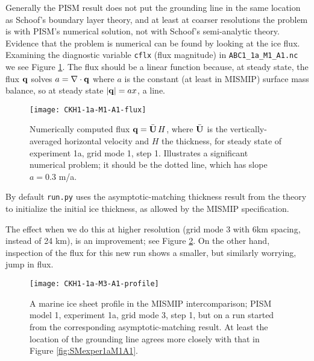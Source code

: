 Generally the PISM result does not put the grounding line in the same location as Schoof's boundary layer theory, and at least at coarser resolutions the problem is with PISM's numerical solution, not with Schoof's semi-analytic theory.  Evidence that the problem is numerical can be found by looking at the ice flux.  Examining the diagnostic variable \texttt{cflx} (flux magnitude) in \texttt{ABC1_1a_M1_A1.nc} we see Figure \ref{fig:cflx1aM1A1}.  The flux should be a linear function because, at steady state, the flux $\mathbf{q}$ solves $a=\nabla\cdot\mathbf{q}$ where $a$ is the constant (at least in MISMIP) surface mass balance, so at steady state $|\mathbf{q}| = a x$, a line.

\begin{figure}[ht]
\centering
\texttt{[image: CKH1-1a-M1-A1-flux]}
\caption{Numerically computed flux $\mathbf{q} = \bar{\mathbf{U}}\, H$, where $\bar{\mathbf{U}}$ is the vertically-averaged horizontal velocity and $H$ the thickness, for steady state of experiment 1a, grid mode 1, step 1.  Illustrates a significant numerical problem; it should be the dotted line, which has slope $a = 0.3$ m/a.}
\label{fig:cflx1aM1A1}
\end{figure}

By default \texttt{run.py} uses the asymptotic-matching thickness result from the \cite{SchoofMarine1} theory to initialize the initial ice thickness, as allowed by the MISMIP specification.

The effect when we do this at higher resolution (grid mode 3 with 6km spacing, instead of 24 km), is an improvement; see Figure \ref{fig:MISMIPmodel1exper1aM3A1FROMSM}.
On the other hand, inspection of the flux for this new run shows a smaller, but similarly worrying, jump in flux.

\begin{figure}[ht]
\centering
\texttt{[image: CKH1-1a-M3-A1-profile]}
\caption{A marine ice sheet profile in the MISMIP intercomparison; PISM model 1, experiment 1a, grid mode 3, step 1, but on a run started from the corresponding asymptotic-matching result.  At least the location of the grounding line agrees more closely with that in Figure \ref{fig:SMexper1aM1A1}.}
\label{fig:MISMIPmodel1exper1aM3A1FROMSM}
\end{figure}



